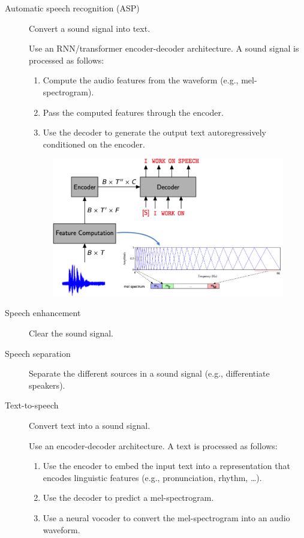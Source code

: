 \begin{description}
    \item[Automatic speech recognition (ASP)]
        Convert a sound signal into text.

        \begin{example}
            Use an RNN/transformer encoder-decoder architecture. A sound signal is processed as follows:
            \begin{enumerate}
                \item Compute the audio features from the waveform (e.g., mel-spectrogram).
                \item Pass the computed features through the encoder.
                \item Use the decoder to generate the output text autoregressively conditioned on the encoder.
            \end{enumerate}

            \begin{figure}[H]
                \centering
                \includegraphics[width=0.5\linewidth]{./img/asp_arch.png}
            \end{figure}
        \end{example}

    \item[Speech enhancement]
        Clear the sound signal.

    \item[Speech separation]
        Separate the different sources in a sound signal (e.g., differentiate speakers).

    \item[Text-to-speech]
        Convert text into a sound signal.

        \begin{example}
            Use an encoder-decoder architecture. A text is processed as follows:
            \begin{enumerate}
                \item Use the encoder to embed the input text into a representation that encodes linguistic features (e.g., pronunciation, rhythm, \dots).
                \item Use the decoder to predict a mel-spectrogram.
                \item Use a neural vocoder to convert the mel-spectrogram into an audio waveform.
            \end{enumerate}


\end{example}
\end{description}
